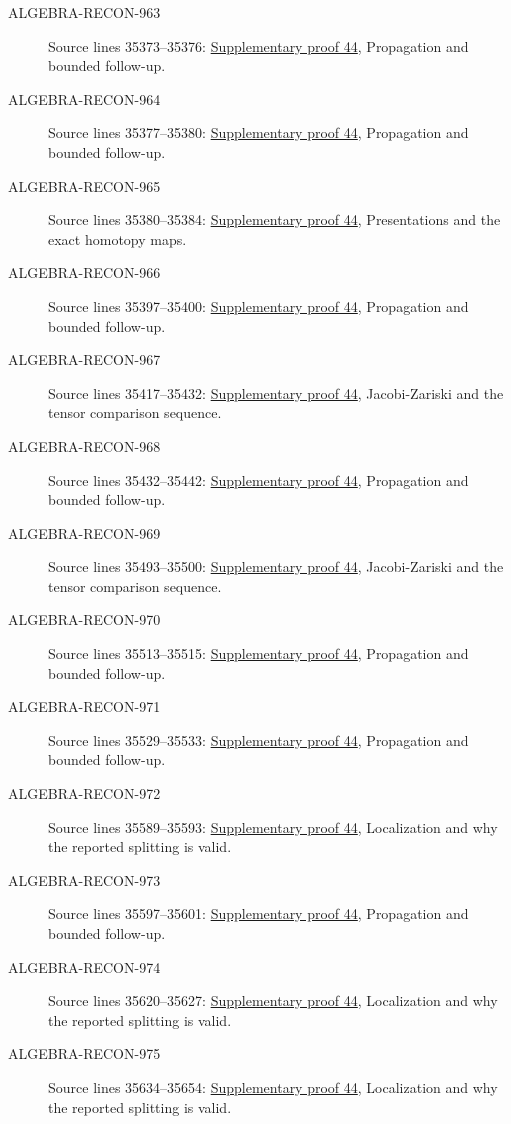 \begin{description}
\item[ALGEBRA-RECON-963] Source lines 35373--35376: \hyperlink{algebra_naive_cotangent_notes_20260928}{Supplementary proof 44}, Propagation and bounded follow-up.
\item[ALGEBRA-RECON-964] Source lines 35377--35380: \hyperlink{algebra_naive_cotangent_notes_20260928}{Supplementary proof 44}, Propagation and bounded follow-up.
\item[ALGEBRA-RECON-965] Source lines 35380--35384: \hyperlink{algebra_naive_cotangent_notes_20260928}{Supplementary proof 44}, Presentations and the exact homotopy maps.
\item[ALGEBRA-RECON-966] Source lines 35397--35400: \hyperlink{algebra_naive_cotangent_notes_20260928}{Supplementary proof 44}, Propagation and bounded follow-up.
\item[ALGEBRA-RECON-967] Source lines 35417--35432: \hyperlink{algebra_naive_cotangent_notes_20260928}{Supplementary proof 44}, Jacobi-Zariski and the tensor comparison sequence.
\item[ALGEBRA-RECON-968] Source lines 35432--35442: \hyperlink{algebra_naive_cotangent_notes_20260928}{Supplementary proof 44}, Propagation and bounded follow-up.
\item[ALGEBRA-RECON-969] Source lines 35493--35500: \hyperlink{algebra_naive_cotangent_notes_20260928}{Supplementary proof 44}, Jacobi-Zariski and the tensor comparison sequence.
\item[ALGEBRA-RECON-970] Source lines 35513--35515: \hyperlink{algebra_naive_cotangent_notes_20260928}{Supplementary proof 44}, Propagation and bounded follow-up.
\item[ALGEBRA-RECON-971] Source lines 35529--35533: \hyperlink{algebra_naive_cotangent_notes_20260928}{Supplementary proof 44}, Propagation and bounded follow-up.
\item[ALGEBRA-RECON-972] Source lines 35589--35593: \hyperlink{algebra_naive_cotangent_notes_20260928}{Supplementary proof 44}, Localization and why the reported splitting is valid.
\item[ALGEBRA-RECON-973] Source lines 35597--35601: \hyperlink{algebra_naive_cotangent_notes_20260928}{Supplementary proof 44}, Propagation and bounded follow-up.
\item[ALGEBRA-RECON-974] Source lines 35620--35627: \hyperlink{algebra_naive_cotangent_notes_20260928}{Supplementary proof 44}, Localization and why the reported splitting is valid.
\item[ALGEBRA-RECON-975] Source lines 35634--35654: \hyperlink{algebra_naive_cotangent_notes_20260928}{Supplementary proof 44}, Localization and why the reported splitting is valid.

\end{description}
